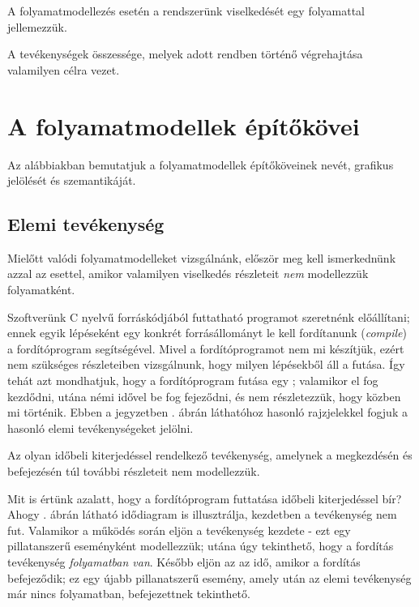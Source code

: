 A folyamatmodellezés esetén a rendszerünk viselkedését egy folyamattal jellemezzük.

\begin{definicio}
	A  tevékenységek összessége, melyek adott rendben történő végrehajtása valamilyen célra vezet.
\end{definicio}

\section{A folyamatmodellek építőkövei}

Az alábbiakban bemutatjuk a folyamatmodellek építőköveinek nevét, grafikus jelölését és szemantikáját.


\subsection{Elemi tevékenység}

Mielőtt valódi folyamatmodelleket vizsgálnánk, először meg kell ismerkednünk azzal az esettel, amikor valamilyen viselkedés részleteit \emph{nem} modellezzük folyamatként.

\begin{pelda}
Szoftverünk C nyelvű forráskódjából futtatható programot szeretnénk előállítani; ennek egyik lépéseként egy konkrét forrásállományt le kell fordítanunk (\emph{compile}) a fordítóprogram segítségével. Mivel a fordítóprogramot nem mi készítjük, ezért nem szükséges részleteiben vizsgálnunk, hogy milyen lépésekből áll a futása. Így tehát azt mondhatjuk, hogy a fordítóprogram futása egy ; valamikor el fog kezdődni, utána némi idővel be fog fejeződni, és nem részletezzük, hogy közben mi történik. Ebben a jegyzetben . ábrán láthatóhoz hasonló rajzjelekkel fogjuk a hasonló elemi tevékenységeket jelölni.
\end{pelda}

\begin{definicio}
	Az  olyan időbeli kiterjedéssel rendelkező tevékenység, amelynek a megkezdésén és befejezésén túl további részleteit nem modellezzük.
\end{definicio}


\begin{pelda}
Mit is értünk azalatt, hogy a fordítóprogram futtatása időbeli kiterjedéssel bír? Ahogy . ábrán látható idődiagram is illusztrálja, kezdetben a tevékenység nem fut. Valamikor a működés során eljön a tevékenység kezdete - ezt egy pillatanszerű eseményként modellezzük; utána úgy tekinthető, hogy a fordítás tevékenység \emph{folyamatban van}. Később eljön az az idő, amikor a fordítás befejeződik; ez egy újabb pillanatszerű esemény, amely után az elemi tevékenység már nincs folyamatban, befejezettnek tekinthető.
\end{pelda}

